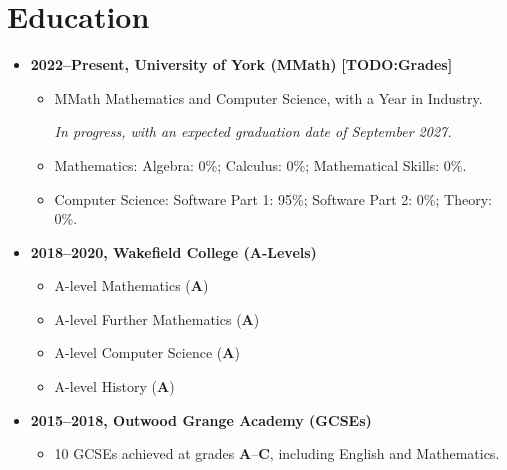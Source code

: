 \documentclass{article}
\makeatletter
\newcommand{\smallmargin}[1]{\marginpar{\raggedright\footnotesize #1}}
\newcommand{\todomark}[1]{{\color{red}\textbf{[TODO:\@ #1]}}}
\makeatother
\begin{document}
\section{Education}
\begin{itemize}
        \item \textbf{2022--Present, University of York (MMath)}
        \todomark{Grades}
        \smallmargin{\color{red}{Drafting note: I have added module titles as
        requested, but I do not yet know my marks in most cases.}}
        \begin{itemize}
                \item MMath Mathematics and Computer Science, with a Year in
                Industry.

                \textit{In progress, with an expected graduation date of
                September 2027.}

                \item Mathematics: Algebra: 0\%; Calculus: 0\%; Mathematical
                Skills: 0\%.

                \item Computer Science: Software Part 1: 95\%; Software Part 2:
                0\%; Theory: 0\%.
        \end{itemize}
        \item \textbf{2018--2020, Wakefield College (A-Levels)}
        \begin{itemize}
                \item A-level Mathematics (\textbf{A})
                \item A-level Further Mathematics (\textbf{A})
                \item A-level Computer Science (\textbf{A})
                \item A-level History (\textbf{A})
        \end{itemize}
        \item \textbf{2015--2018, Outwood Grange Academy (GCSEs)}
        \begin{itemize}
                \item 10 GCSEs achieved at grades \textbf{A}--\textbf{C},
                including English and Mathematics.
        \end{itemize}
\end{itemize}

%
%
\end{document}
